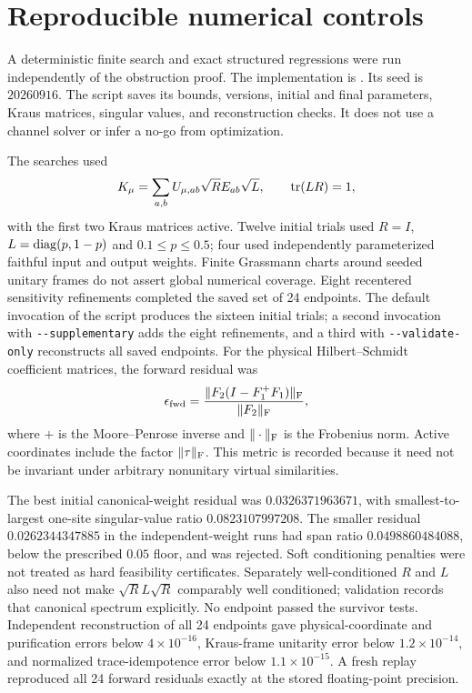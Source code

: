 \section{Reproducible numerical controls}
\label{sec:numerics}

A deterministic finite search and exact structured regressions were run
independently of the obstruction proof. The implementation is
.
Its seed is $20260916$. The script saves its bounds, versions, initial
and final parameters, Kraus matrices, singular values, and reconstruction
checks. It does not use a channel solver or infer a no-go from optimization.

The searches used
\begin{align}
	K_\mu=\sum_{a,b}U_{\mu,ab}\sqrt R E_{ab}\sqrt L,
	\qquad \operatorname{tr}(LR)=1,
\end{align}
with the first two Kraus matrices active. Twelve initial trials used
$R=I$, $L=\operatorname{diag}(p,1-p)$ and $0.1\leq p\leq0.5$; four used independently
parameterized faithful input and output weights. Finite Grassmann charts
around seeded unitary frames do not assert global numerical coverage.
Eight recentered sensitivity refinements completed the saved set of
24 endpoints. The default invocation of the script produces the sixteen
initial trials; a second invocation with \texttt{-{}-supplementary} adds the
eight refinements, and a third with \texttt{-{}-validate-only} reconstructs
all saved endpoints. For the physical Hilbert--Schmidt coefficient matrices,
the forward residual was
\begin{align}
	\epsilon_{\rm fwd}
	=\frac{\|F_2(I-F_1^+F_1)\|_{\rm F}}{\|F_2\|_{\rm F}},
\end{align}
where $+$ is the Moore--Penrose inverse and $\|\cdot\|_{\rm F}$ is the
Frobenius norm. Active coordinates include the factor $\|\tau\|_{\rm F}$.
This metric is recorded because it need not be invariant under arbitrary
nonunitary virtual similarities.

The best initial canonical-weight residual was $0.0326371963671$,
with smallest-to-largest one-site singular-value ratio $0.0823107997208$.
The smaller residual $0.0262344347885$ in the independent-weight runs
had span ratio $0.0498860484088$, below the prescribed $0.05$ floor,
and was rejected. Soft conditioning penalties were not treated as
hard feasibility certificates. Separately well-conditioned $R$ and $L$
also need not make $\sqrt R L\sqrt R$ comparably well conditioned;
validation records that canonical spectrum explicitly.
No endpoint passed the survivor tests. Independent reconstruction of
all 24 endpoints gave physical-coordinate and purification errors below
$4\times10^{-16}$, Kraus-frame unitarity error below $1.2\times10^{-14}$,
and normalized trace-idempotence error below $1.1\times10^{-15}$.
A fresh replay reproduced all 24 forward residuals exactly at the
stored floating-point precision.

